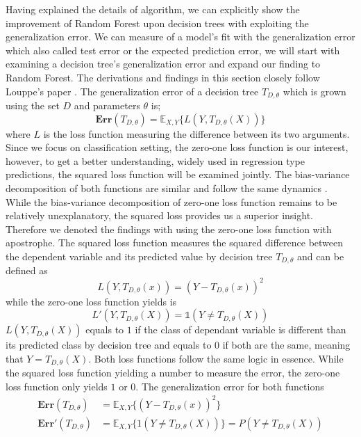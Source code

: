 Having explained the details of algorithm, we can explicitly show the improvement of Random Forest upon decision trees 
with exploiting the generalization error. 
We can measure of a model's fit with the generalization error which also called test error or the expected prediction error, 
we will start with examining a decision tree's generalization error and expand our finding to Random Forest. 
The derivations and findings in this section closely follow Louppe's paper \cite{louppe2014understanding}.
The generalization error of a decision tree $T_{D,\theta}$ which is grown using the set $D$ and parameters $\theta$ is;
\begin{equation}
	\boldsymbol{Err}(T_{D,\theta}) = \mathbb{E}_{X,Y}\{L(Y, T_{D,\theta}(X)) \}
\end{equation}
where $L$ is the loss function measuring the difference between its two arguments. 
Since we focus on classification setting, 
the zero-one loss function is our interest, however, 
to get a better understanding, widely used in regression type predictions, 
the squared loss function will be examined jointly. 
The bias-variance decomposition of both functions are similar and 
follow the same dynamics \cite{domingos2000decomposition}. 
While the bias-variance decomposition of zero-one loss function remains 
to be relatively unexplanatory, the squared loss provides us a superior insight. 
Therefore we denoted the findings with using the zero-one loss function with apostrophe.
The squared loss function measures the squared difference between the dependent variable and its predicted value 
by decision tree $T_{D,\theta}$ and can be defined as
\begin{equation}
	L(Y, T_{D, \theta}(x)) = (Y - T_{D, \theta}(x))^2
\end{equation}
while the zero-one loss function yields is
\begin{equation}
	L'(Y, T_{D,\theta}(X)) = \mathds{1} (Y \neq T_{D, \theta}(X))
\end{equation}
$L(Y, T_{D,\theta}(X))$ equals to $1$ if the class of dependant variable is 
different than its predicted class by decision tree and equals to 0 if both are the same, 
meaning that $Y = T_{D, \theta}(X)$. 
Both loss functions follow the same logic in essence. 
While the squared loss function yielding a number to measure the error, 
the zero-one loss function only yields $1$ or $0$.
The generalization error for both functions 
\begin{align}
	\boldsymbol{Err}(T_{D,\theta}) & = \mathbb{E}_{X,Y}\{ (Y - T_{D, \theta}(x))^2 \} \\
	\boldsymbol{Err'}(T_{D,\theta}) & = \mathbb{E}_{X,Y}\{ 1(Y \neq T_{D, \theta}(X)) \}
	= P(Y \neq T_{D, \theta}(X))
\end{align}
